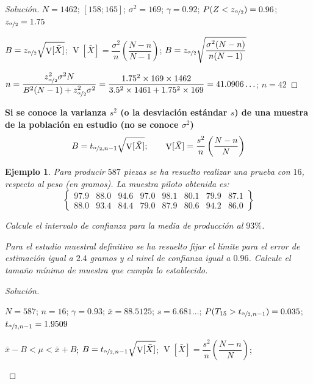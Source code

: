 \documentclass[a5paper,doc,10pt,noapacite]{apa6}
\DeclareMathOperator{\Var}{V}
\newtheorem{ejem}{Ejemplo}
\begin{document}
{{\begin{proof}[Solución]
		\(N=1462\); \([158;165]\); \(\sigma^2=169\); \(\gamma=0.92\); \(P(Z<z_{\nicefrac{\alpha}{2}})=0.96\); \(z_{\nicefrac{\alpha}{2}}=1.75\)
		
		\(B=z_{\nicefrac{\alpha}{2}}\sqrt{\Var[\bar{X}]}\); \(\Var[\bar{X}]=\dfrac{\sigma^2}{n}\left(\dfrac{N-n}{N-1}\right)\); \(B=z_{\nicefrac{\alpha}{2}}\sqrt{\dfrac{\sigma^2(N-n)}{n(N-1)}}\)
		
		\(n=\dfrac{z_{\nicefrac{\alpha}{2}}^2\sigma^2 N}{B^2(N-1)+z_{\nicefrac{\alpha}{2}}^2\sigma^2}=\dfrac{1.75^2 \times 169 \times 1462}{3.5^2 \times 1461+1.75^2 \times 169}=41.0906\ldots\); \(n=42\)
\end{proof}


\vspace{0.75\baselineskip}
	\textbf{Si se conoce la varianza \(s^2\) (o la desviación estándar \(s\)) de una muestra de la población en estudio (no se conoce \(\sigma^2\)) }
	\[
		B=t_{\nicefrac{\alpha}{2},n-1}\sqrt{\Var[\bar{X}]}; \qquad
		\Var[\bar{X}]=\dfrac{s^2}{n}\left(\dfrac{N-n}{N}\right)
	\]
	

\begin{ejem}
	Para producir \(587\) piezas se ha resuelto realizar una prueba con \(16\), respecto al peso (en gramos). La muestra piloto obtenida es:
	\[\begin{Bmatrix}
	97.9 & 88.0 & 94.6 & 97.0 & 98.1 & 80.1 & 79.9 & 87.1 \\
	 88.0 & 93.4 & 84.4 & 79.0 & 87.9 & 80.6 & 94.2 & 86.0
	\end{Bmatrix}\]

\begin{APAenumerate}
	\item Calcule el intervalo de confianza para la media de producción al \(93\%\). 
	\item Para el estudio muestral definitivo se ha resuelto fijar el límite para el error de estimación igual a \(2.4\) gramos y el nivel de confianza igual a \(0.96\). Calcule el tamaño mínimo de muestra que cumpla lo establecido.
\end{APAenumerate}
\end{ejem}
\begin{proof}[Solución]\quad
	\begin{APAenumerate}
		\item \(N=587\); \(n=16\); \(\gamma=0.93\); \(\bar{x}=88.5125\); \(s=6.681\ldots\); \(P(T_{15}>t_{\nicefrac{\alpha}{2},n-1})=0.035\); \(t_{\nicefrac{\alpha}{2},n-1}=1.9509\)
		
		\(\bar{x}-B<\mu<\bar{x}+B\); \(B=t_{\nicefrac{\alpha}{2},n-1}\sqrt{\Var[\bar{X}]}\); \(\Var[\bar{X}]=\dfrac{s^2}{n}\left(\dfrac{N-n}{N}\right)\);
		

\end{APAenumerate}
\end{proof}}}
\end{document}
